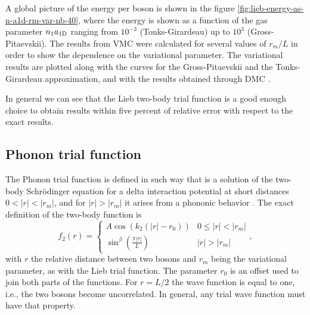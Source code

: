 A global picture of the energy per boson is shown in the figure
\ref{fig:lieb-energy-as-n-a1d-rm-var-nb-40}, where the energy is shown as a
function of the gas parameter ${{n}_1} a_{ \mathrm{1D} }$ ranging from $10^{-3}$
(Tonks-Girardeau) up to $10^{3}$ (Gross-Pitaevskii). The results from {VMC} were
calculated for several values of $r_m / L$ in order to show the dependence on
the variational parameter. The variational results are plotted along with the
curves for the Gross-Pitaevskii and the Tonks-Girardeau approximation, and with
the results obtained through DMC
\cite{bib:astrakharchik-phys-rev-a.68.031602.2003}.

In general we can see that the Lieb two-body trial function is a good enough
choice to obtain results within five percent of relative error with respect to
the exact results.
%

\subsection{Phonon trial function}

The Phonon trial function is defined in such way that is a solution of the
two-body Schrödinger equation for a delta interaction potential at short
distances $0 < |r| < |r_m|$, and for $|r| > |r_m|$ it arises from a phononic
behavior \cite[]{bib:reatto-phys-rev.155.1967} . The exact definition of the
two-body function is
%
\begin{equation}
	\label{eq:vmc-phonon-two-body-function}
	f_2(r) = \begin{cases}
	A \cos(k_2(|r| - r_0)) & 0 \leq|r| < |r_m| \\
	\sin^{\beta}\left(\frac{\pi |r|}{L} \right) & |r| > |r_m|
	\end{cases},
\end{equation}
%
with $r$ the relative distance between two bosons and $r_m$ being the
variational parameter, as with the Lieb trial function. The parameter $r_0$ is
an offset used to join both parts of the functions. For $r = L/2$ the wave
function is equal to one, i.e., the two bosons become uncorrelated. In general,
any trial wave function must have that property.

